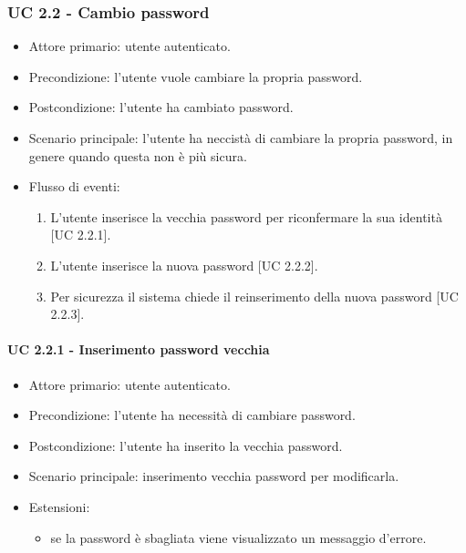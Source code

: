     \subsubsection{UC 2.2 - Cambio password}
        \begin{itemize}
            \item Attore primario: utente autenticato.
            \item Precondizione: l'utente vuole cambiare la propria password.
            \item Postcondizione: l'utente ha cambiato password.
            \item Scenario principale: l'utente ha neccistà di cambiare la propria password, in genere quando questa non è più sicura.
            \item Flusso di eventi:
                \begin{enumerate}
                    \item L'utente inserisce la vecchia password per riconfermare la sua identità [UC 2.2.1].
                    \item L'utente inserisce la nuova password [UC 2.2.2].
                    \item Per sicurezza il sistema chiede il reinserimento della nuova password [UC 2.2.3].
                \end{enumerate}
        \end{itemize}
        \paragraph{UC 2.2.1 - Inserimento password vecchia}
            \begin{itemize}
                \item Attore primario: utente autenticato.
                \item Precondizione: l'utente ha necessità di cambiare password.
                \item Postcondizione: l'utente ha inserito la vecchia password.
                \item Scenario principale: inserimento vecchia password per modificarla.
                \item Estensioni:
                    \begin{itemize}
                        \item se la password è sbagliata viene visualizzato un messaggio d'errore.
                    \end{itemize}
            \end{itemize}
